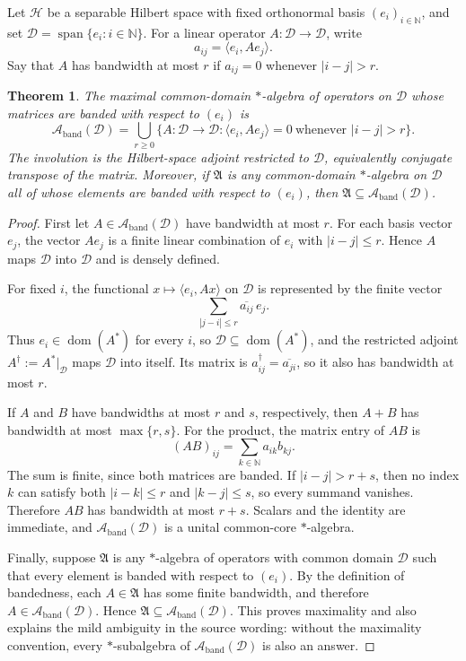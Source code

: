 \documentclass[11pt]{article}
\newtheorem{theorem}{Theorem}
\newcommand{\cH}{\mathcal H}
\newcommand{\cD}{\mathcal D}
\newcommand{\cA}{\mathcal A}
\newcommand{\N}{\mathbb N}
\begin{document}
Let $\cH$ be a separable Hilbert space with fixed orthonormal basis
$(e_i)_{i\in\N}$, and set $\cD=\operatorname{span}\{e_i:i\in\N\}$.
For a linear operator $A:\cD\to\cD$, write
\[
  a_{ij}=\langle e_i,Ae_j\rangle .
\]
Say that $A$ has bandwidth at most $r$ if $a_{ij}=0$ whenever
$|i-j|>r$.

\begin{theorem}
The maximal common-domain $*$-algebra of operators on $\cD$ whose matrices are
banded with respect to $(e_i)$ is
\[
  \cA_{\mathrm{band}}(\cD)
  =
  \bigcup_{r\geq 0}
  \{A:\cD\to\cD:\langle e_i,Ae_j\rangle=0\ \text{whenever } |i-j|>r\}.
\]
The involution is the Hilbert-space adjoint restricted to $\cD$, equivalently
conjugate transpose of the matrix.  Moreover, if $\mathfrak A$ is any
common-domain $*$-algebra on $\cD$ all of whose elements are banded with
respect to $(e_i)$, then $\mathfrak A\subseteq \cA_{\mathrm{band}}(\cD)$.
\end{theorem}

\begin{proof}
First let $A\in\cA_{\mathrm{band}}(\cD)$ have bandwidth at most $r$.  For
each basis vector $e_j$, the vector $Ae_j$ is a finite linear combination of
$e_i$ with $|i-j|\leq r$.  Hence $A$ maps $\cD$ into $\cD$ and is densely
defined.

For fixed $i$, the functional $x\mapsto \langle e_i,Ax\rangle$ on $\cD$ is
represented by the finite vector
\[
  \sum_{|j-i|\leq r}\overline{a_{ij}}\,e_j .
\]
Thus $e_i\in\operatorname{dom}(A^*)$ for every $i$, so
$\cD\subseteq\operatorname{dom}(A^*)$, and the restricted adjoint
$A^\dagger:=A^*|_{\cD}$ maps $\cD$ into itself.  Its matrix is
$a^\dagger_{ij}=\overline{a_{ji}}$, so it also has bandwidth at most $r$.

If $A$ and $B$ have bandwidths at most $r$ and $s$, respectively, then
$A+B$ has bandwidth at most $\max\{r,s\}$.  For the product, the matrix entry
of $AB$ is
\[
  (AB)_{ij}=\sum_{k\in\N} a_{ik}b_{kj}.
\]
The sum is finite, since both matrices are banded.  If $|i-j|>r+s$, then no
index $k$ can satisfy both $|i-k|\leq r$ and $|k-j|\leq s$, so every summand
vanishes.  Therefore $AB$ has bandwidth at most $r+s$.  Scalars and the
identity are immediate, and $\cA_{\mathrm{band}}(\cD)$ is a unital
common-core $*$-algebra.

Finally, suppose $\mathfrak A$ is any $*$-algebra of operators with common
domain $\cD$ such that every element is banded with respect to $(e_i)$.  By
the definition of bandedness, each $A\in\mathfrak A$ has some finite bandwidth,
and therefore $A\in\cA_{\mathrm{band}}(\cD)$.  Hence
$\mathfrak A\subseteq\cA_{\mathrm{band}}(\cD)$.  This proves maximality and
also explains the mild ambiguity in the source wording: without the maximality
convention, every $*$-subalgebra of $\cA_{\mathrm{band}}(\cD)$ is also an
answer.
\end{proof}
\end{document}
